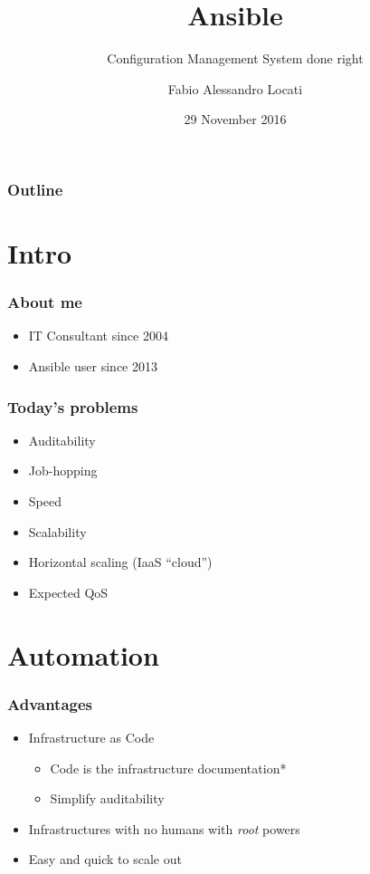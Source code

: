 \documentclass[t,aspectratio=169]{beamer}
\title{Ansible}
\subtitle{Configuration Management System done right}
\author{Fabio Alessandro Locati}
\date{29 November 2016}
\institute{Senior Cloud Consultant}
\begin{document}
\maketitle

\begin{frame}
    \frametitle{Outline}
    \tableofcontents
\end{frame}

\section{Intro}
\begin{frame}
    \frametitle{About me}
    \begin{itemize}
        \item<2-> IT Consultant since 2004
        \item<3-> Ansible user since 2013
    \end{itemize}
\end{frame}

\begin{frame}
    \frametitle{Today's problems}
    \begin{itemize}
        \item<2-> Auditability
        \item<3-> Job-hopping
        \item<4-> Speed
        \item<5-> Scalability
        \item<6-> Horizontal scaling (IaaS ``cloud'')
        \item<7-> Expected QoS
    \end{itemize}
\end{frame}

\section{Automation}

\begin{frame}
    \frametitle{Advantages}
    \begin{itemize}
        \item<2-> Infrastructure as Code
        \begin{itemize}
            \item<3-> Code is the infrastructure documentation*
            \item<4-> Simplify auditability
        \end{itemize}
        \item<5-> Infrastructures with no humans with \textit{root} powers
        \item<6-> Easy and quick to scale out
    \end{itemize}
\end{frame}
\end{document}
